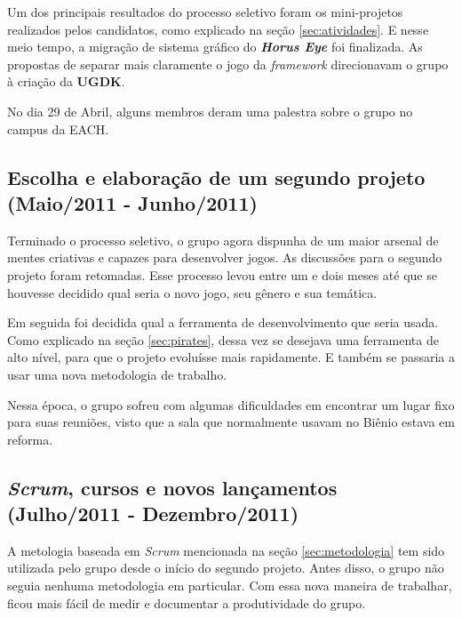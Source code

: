 \documentclass[12pt,onecolumn,a4paper]{article}
\begin{document}
        Um dos principais resultados do processo seletivo foram os mini-projetos realizados pelos
        candidatos, como explicado na seção \ref{sec:atividades}. E nesse meio tempo, a migração de
        sistema gráfico do \textit{\textbf{Horus Eye}} foi finalizada. As propostas de separar mais
        claramente o jogo da \textit{framework} direcionavam o grupo à criação da \textbf{UGDK}.
        
        No dia 29 de Abril, alguns membros deram uma palestra sobre o grupo no campus da EACH.

    \clearpage
    \subsection{Escolha e elaboração de um segundo projeto \\
                {\small(Maio/2011 - Junho/2011)} }
        Terminado o processo seletivo, o grupo agora dispunha de um maior arsenal de mentes
        criativas e capazes para desenvolver jogos. As discussões para o segundo projeto foram
        retomadas. Esse processo levou entre um e dois meses até que se houvesse decidido qual seria
        o novo jogo, seu gênero e sua temática.
        
        Em seguida foi decidida qual a ferramenta de desenvolvimento que seria usada. Como explicado
        na seção \ref{sec:pirates}, dessa vez se desejava uma ferramenta de alto nível, para que o
        projeto evoluísse mais rapidamente. E também se passaria a usar uma nova metodologia de
        trabalho.
        
        Nessa época, o grupo sofreu com algumas dificuldades em encontrar um lugar fixo para suas
        reuniões, visto que a sala que normalmente usavam no Biênio estava em reforma.

    \clearpage
    \subsection{\textit{Scrum}, cursos e novos lançamentos \\
                {\small(Julho/2011 - Dezembro/2011)} }
        A metologia baseada em \textit{Scrum} mencionada na seção \ref{sec:metodologia} tem sido
        utilizada pelo grupo desde o início do segundo projeto. Antes disso, o grupo não seguia
        nenhuma metodologia em particular. Com essa nova maneira de trabalhar, ficou mais fácil de
        medir e documentar a produtividade do grupo.
        
\end{document}
